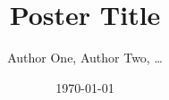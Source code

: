 \documentclass[25pt, a0paper, landscape, margin=0mm, innermargin=15mm, blockverticalspace=15mm, colspace=15mm, subcolspace=8mm]{tikzposter}
\begin{document}
\title{Poster Title}
\author{Author One, Author Two, \ldots}
\date{\today}
\maketitle

\begin{columns}

\end{columns}
\end{document}
